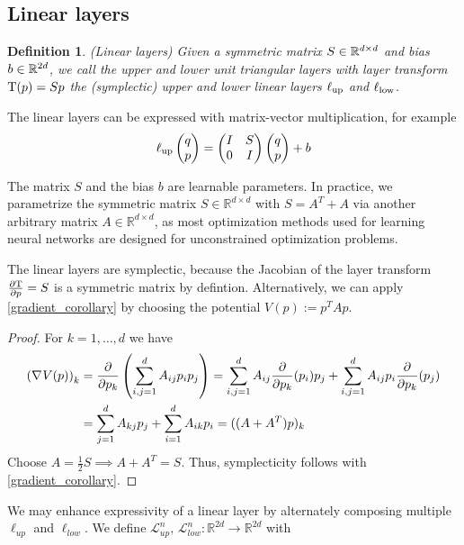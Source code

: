 \documentclass[twoside,a4paper]{article}
\newtheorem{definition}{Definition}
\begin{document}
\subsection{Linear layers}

\begin{definition}\label{def_linear_layer}
	(Linear layers)
	Given a symmetric matrix $S \in \mathbb{R}^{d \times d}$ and bias $b \in \mathbb{R}^{2d}$,
	we call the upper and lower unit triangular layers
	with layer transform $\mathrm{T}(p) = Sp$ the (symplectic) upper and lower 
	linear layers $\ell_{\text{up}}$ and $\ell_{\text{low}}$.
\end{definition}

The linear layers can be expressed with matrix-vector multiplication, for example
\begin{equation*}
	\ell_{\text{up}} \begin{pmatrix} q \\ p \end{pmatrix} = \begin{pmatrix}
		I & S \\
		0 & I
	\end{pmatrix} \begin{pmatrix} q \\ p \end{pmatrix} + b
\end{equation*}

The matrix $S$ and the bias $b$ are learnable parameters.
In practice, we parametrize the symmetric matrix $S\in \mathbb{R}^{d \times d}$
with $S = A^T + A$ via another arbitrary matrix $A\in \mathbb{R}^{d \times d}$, as
most optimization methods used for learning neural networks are designed for
unconstrained optimization problems.

The linear layers are symplectic, because the Jacobian of the layer transform $\frac{\partial \mathrm{T}}{\partial p} = S$
is a symmetric matrix by defintion. Alternatively, we can apply \cref{gradient_corollary} by
choosing the potential $V(p) := p^TAp$.

\begin{proof}
	For $k=1, \dots, d$ we have
	\begin{align*}
		\left( \nabla_{}{V}(p) \right)_k &= \frac{\partial }{\partial p_k} \left( \sum_{i,j=1}^d A_{ij} p_i p_j \right)
		= \sum_{i,j=1}^d A_{ij} \frac{\partial }{\partial p_k}(p_i) p_j + \sum_{i,j=1}^d A_{ij} p_i \frac{\partial }{\partial p_k}(p_j) \\
		&= \sum_{j=1}^d A_{kj} p_j + \sum_{i=1}^d A_{ik} p_i = ((A+A^T)p)_k \\
	\end{align*}
	Choose $A=\frac{1}{2}S \implies A+A^T=S$.
	Thus, symplecticity follows with \cref{gradient_corollary}.
\end{proof}

We may enhance expressivity of a linear layer by alternately composing multiple
$\ell_{up}$ and $\ell_{low}$. We define 
$\mathcal{L}^{n}_{up},\, \mathcal{L}^{n}_{low} : \mathbb{R}^{2d} \to \mathbb{R}^{2d}$ with
\end{document}
